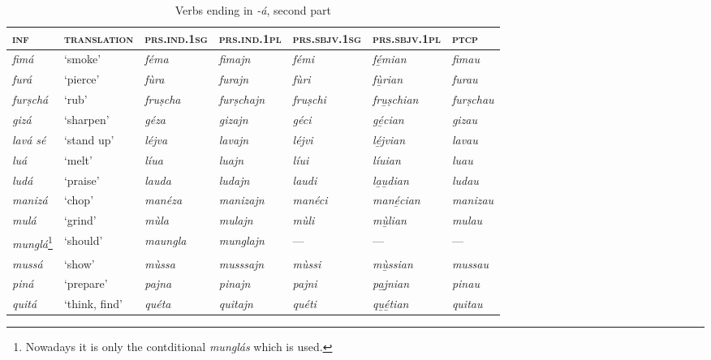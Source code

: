 \begin{sidewaystable} 
	\caption{Verbs ending in \textit{-á}, second part}
	\label{stemalta2}
	\begin{tabularx}{\textwidth}{lllllll} 
		\lsptoprule
		\textsc{\textbf{inf}} & \textsc{\textbf{translation}} & \textsc{\textbf{prs.ind.1sg}} & \textsc{\textbf{prs.ind.1pl}} & \textsc{\textbf{prs.sbjv.1sg}} & \textsc{\textbf{prs.sbjv.1pl}} &  \textbf{\textsc{ptcp}}\\
		\midrule
		\textit{fimá} & `smoke' & \textit{féma} & \textit{fimajn} & \textit{fémi} & \textit{fé̱mian} & \textit{fimau}\\
		\textit{furá} & ‘pierce’ & \textit{fùra} & \textit{furajn} & \textit{fùri} & \textit{fù̱rian} & \textit{furau}\\
		\textit{furṣchá} & `rub' & \textit{fruṣcha} & \textit{furṣchajn} & \textit{fruṣchi} & \textit{fru̱ṣchian} & \textit{furṣchau}\\
		\textit{gizá} & `sharpen' & \textit{géza} & \textit{gizajn} & \textit{géci} & \textit{gé̱cian} & \textit{gizau}\\
		\textit{lavá sé} & `stand up' & \textit{léjva} & \textit{lavajn} & \textit{léjvi} & \textit{lé̱jvian} & \textit{lavau}\\
		\textit{luá} & `melt' & \textit{líua} & \textit{luajn} & \textit{líui} & \textit{líuian}  & \textit{luau}\\
		\textit{ludá} & `praise' & \textit{lauda} & \textit{ludajn} & \textit{laudi} & \textit{la̱u̱dian} & \textit{ludau}\\
		\textit{manizá} & `chop' & \textit{manéza} & \textit{manizajn} & \textit{manéci} & \textit{mané̱cian} & \textit{manizau}\\
		\textit{mulá} & `grind' & \textit{mùla} & \textit{mulajn} &  \textit{mùli} & \textit{mù̱lian} & \textit{mulau}\\
		\textit{munglá}\footnote{Nowadays it is only the contditional \textit{munglás} which is used.} & ‘should’ & \textit{maungla} & \textit{munglajn} & --- & --- & ---\\
		\textit{mussá} & ‘show’ & \textit{mùssa} & \textit{musssajn} & \textit{mùssi} & \textit{mù̱ssian} & \textit{mussau}\\
		\textit{piná} & `prepare' & \textit{pajna} & \textit{pinajn} & \textit{pajni} & \textit{pa̱j̱nian} & \textit{pinau}\\
		\textit{quitá} & `think, find' & \textit{quéta} & \textit{quitajn} & \textit{quéti} & \textit{qu̱é̱tian} & \textit{quitau}\\

\end{tabularx}
\end{sidewaystable}
